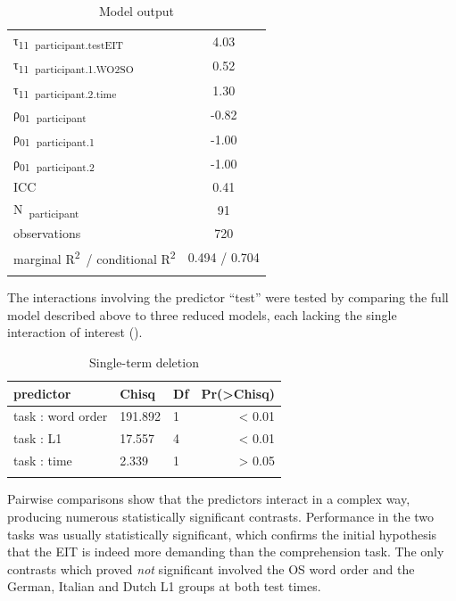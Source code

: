 \begin{table}
\begin{tabularx}{\textwidth}{Xrrr}
    τ\textsubscript{11}~\textsubscript{participant.testEIT} & \multicolumn{3}{c}{4.03}\\
    τ\textsubscript{11}~\textsubscript{participant.1.WO2SO} & \multicolumn{3}{c}{0.52}\\
    τ\textsubscript{11}~\textsubscript{participant.2.time} & \multicolumn{3}{c}{1.30}\\
    ρ\textsubscript{01}~\textsubscript{participant} & \multicolumn{3}{c}{{}-0.82}\\
    ρ\textsubscript{01}~\textsubscript{participant.1} & \multicolumn{3}{c}{{}-1.00}\\
    ρ\textsubscript{01}~\textsubscript{participant.2} & \multicolumn{3}{c}{{}-1.00}\\
    ICC & \multicolumn{3}{c}{0.41}\\
    N~\textsubscript{participant} & \multicolumn{3}{c}{91}\\
    observations & \multicolumn{3}{c}{720}\\
    marginal R\textsuperscript{2}~/ conditional R\textsuperscript{2} & \multicolumn{3}{c}{0.494 / 0.704}\\
    \lspbottomrule
    \end{tabularx}
    \caption{Model output}
    \label{tab:06:7}
\end{table}

The interactions involving the predictor “test” were tested by comparing the full model described above to three reduced models, each lacking the single interaction of interest ().

\begin{table}
    \begin{tabularx}{\textwidth}{XXXr}
    \lsptoprule
    predictor & Chisq & Df & Pr(>Chisq)\\
    \midrule
    task : word order & 191.892 & 1 & < 0.01\\
    task : L1 & 17.557 & 4 & < 0.01\\
    task : time & 2.339 & 1 & > 0.05\\
    \lspbottomrule
    \end{tabularx}
    \caption{Single-term deletion}
    \label{tab:06:8}
\end{table}

Pairwise comparisons show that the predictors interact in a complex way, producing numerous statistically significant contrasts. Performance in the two tasks was usually statistically significant, which confirms the initial hypothesis that the EIT is indeed more demanding than the comprehension task. The only contrasts which proved \textit{not} significant involved the OS word order and the German, Italian and Dutch L1 groups at both test times.

